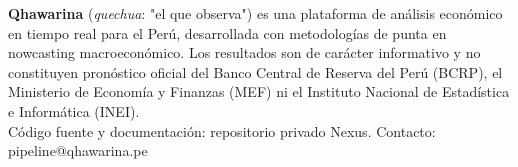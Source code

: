 \documentclass[10pt,a4paper]{article}
\begin{document}
\vspace{1em}

\begin{tcolorbox}[
  enhanced,
  colback=bg,
  colframe=border,
  boxrule=0.5pt,
  arc=2pt,
  left=6pt, right=6pt, top=4pt, bottom=4pt,
]
  {\footnotesize\color{ink3}
    \textbf{Qhawarina} (\textit{quechua}: "el que observa") es una plataforma de análisis
    económico en tiempo real para el Perú, desarrollada con metodologías de punta en
    nowcasting macroeconómico. Los resultados son de carácter informativo y no constituyen
    pronóstico oficial del Banco Central de Reserva del Perú (BCRP), el Ministerio de
    Economía y Finanzas (MEF) ni el Instituto Nacional de Estadística e Informática (INEI).\\[4pt]
    Código fuente y documentación: repositorio privado Nexus.
    Contacto: pipeline@qhawarina.pe
  }
\end{tcolorbox}
\end{document}
